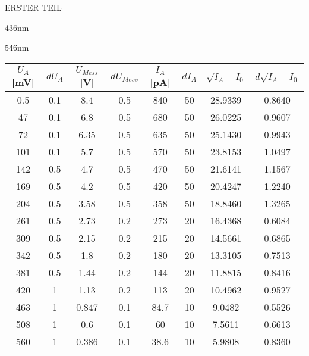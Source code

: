 \begin{appendix}
\begin{chapter}{ERSTER TEIL}
\begin{section}{436nm}
        \newpage
      \end{section}
      
     
     
      \newpage
      \begin{section}{546nm}
        \label{Anhang:chp:ERSTERTEIL:sec:546}
        
        \begin{table}[htbp]
          \centering
          \scriptsize
          \begin{tabular}{|c|c|c|c|c|c|c|c|}
            \hline
            $U_{A}$ [mV] & $dU_{A}$ & $U_{Mess}$ [V] & $dU_{Mess}$ & 
                $I_{A}$ [pA] & $dI_{A}$ & $\sqrt{I_{A}-I_0}$ & 
                $d\sqrt{I_{A}-I_0}$ \\ \hline
            0.5 & 0.1 & 8.4 & 0.5 & 840 & 50 & 28.9339 & 0.8640 \\ \hline
            47 & 0.1 & 6.8 & 0.5 & 680 & 50 & 26.0225 & 0.9607 \\ \hline
            72 & 0.1 & 6.35 & 0.5 & 635 & 50 & 25.1430 & 0.9943 \\ \hline
            101 & 0.1 & 5.7 & 0.5 & 570 & 50 & 23.8153 & 1.0497 \\ \hline
            142 & 0.5 & 4.7 & 0.5 & 470 & 50 & 21.6141 & 1.1567 \\ \hline
            169 & 0.5 & 4.2 & 0.5 & 420 & 50 & 20.4247 & 1.2240 \\ \hline
            204 & 0.5 & 3.58 & 0.5 & 358 & 50 & 18.8460 & 1.3265 \\ \hline
            261 & 0.5 & 2.73 & 0.2 & 273 & 20 & 16.4368 & 0.6084 \\ \hline
            309 & 0.5 & 2.15 & 0.2 & 215 & 20 & 14.5661 & 0.6865 \\ \hline
            342 & 0.5 & 1.8 & 0.2 & 180 & 20 & 13.3105 & 0.7513 \\ \hline
            381 & 0.5 & 1.44 & 0.2 & 144 & 20 & 11.8815 & 0.8416 \\ \hline
            420 & 1 & 1.13 & 0.2 & 113 & 20 & 10.4962 & 0.9527 \\ \hline
            463 & 1 & 0.847 & 0.1 & 84.7 & 10 & 9.0482 & 0.5526 \\ \hline
            508 & 1 & 0.6 & 0.1 & 60 & 10 & 7.5611 & 0.6613 \\ \hline
            560 & 1 & 0.386 & 0.1 & 38.6 & 10 & 5.9808 & 0.8360 \\ \hline

\end{tabular}
\end{table}
\end{section}
\end{chapter}
\end{appendix}
